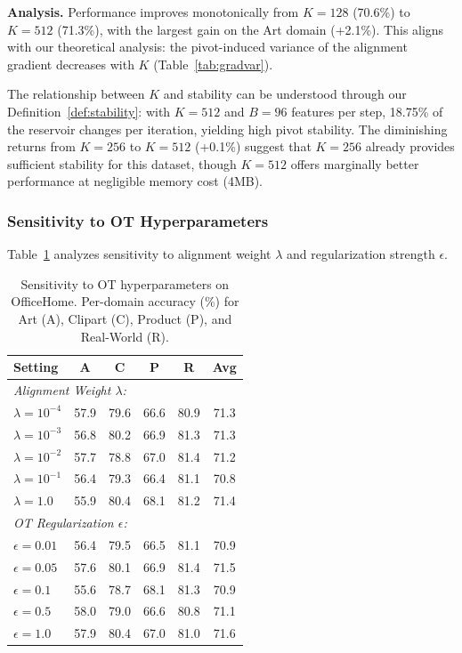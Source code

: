 \textbf{Analysis.} Performance improves monotonically from $K=128$ (70.6\%) to $K=512$ (71.3\%), with the largest gain on the Art domain (+2.1\%). This aligns with our theoretical analysis: the pivot-induced variance of the alignment gradient decreases with $K$ (Table~\ref{tab:gradvar}).

The relationship between $K$ and stability can be understood through our Definition~\ref{def:stability}: with $K=512$ and $B=96$ features per step, 18.75\% of the reservoir changes per iteration, yielding high pivot stability. The diminishing returns from $K=256$ to $K=512$ (+0.1\%) suggest that $K=256$ already provides sufficient stability for this dataset, though $K=512$ offers marginally better performance at negligible memory cost (4MB).

\subsubsection{Sensitivity to OT Hyperparameters}

Table~\ref{tab:ablation_ot} analyzes sensitivity to alignment weight $\lambda$ and regularization strength $\epsilon$.

\begin{table}[t]
\caption{Sensitivity to OT hyperparameters on OfficeHome. Per-domain accuracy (\%) for Art (A), Clipart (C), Product (P), and Real-World (R).}
\label{tab:ablation_ot}
\centering
\small
\renewcommand{\arraystretch}{1.1}
\begin{tabular}{lcccc|c}
\toprule
\textbf{Setting} & \textbf{A} & \textbf{C} & \textbf{P} & \textbf{R} & \textbf{Avg} \\
\midrule
\multicolumn{6}{l}{\textit{Alignment Weight $\lambda$:}} \\
$\lambda = 10^{-4}$ & 57.9 & 79.6 & 66.6 & 80.9 & 71.3 \\
$\lambda = 10^{-3}$ & 56.8 & 80.2 & 66.9 & 81.3 & 71.3 \\
$\lambda = 10^{-2}$ & 57.7 & 78.8 & 67.0 & 81.4 & 71.2 \\
$\lambda = 10^{-1}$ & 56.4 & 79.3 & 66.4 & 81.1 & 70.8 \\
$\lambda = 1.0$ & 55.9 & 80.4 & 68.1 & 81.2 & 71.4 \\
\midrule
\multicolumn{6}{l}{\textit{OT Regularization $\epsilon$:}} \\
$\epsilon = 0.01$ & 56.4 & 79.5 & 66.5 & 81.1 & 70.9 \\
$\epsilon = 0.05$ & 57.6 & 80.1 & 66.9 & 81.4 & 71.5 \\
$\epsilon = 0.1$ & 55.6 & 78.7 & 68.1 & 81.3 & 70.9 \\
$\epsilon = 0.5$ & 58.0 & 79.0 & 66.6 & 80.8 & 71.1 \\
$\epsilon = 1.0$ & 57.9 & 80.4 & 67.0 & 81.0 & 71.6 \\
\bottomrule
\end{tabular}
\end{table}

